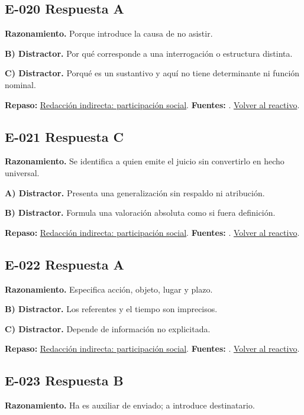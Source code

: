 \subsection*{E-020 \quad Respuesta A}\label{s:E-020}
\textbf{Razonamiento.} Porque introduce la causa de no asistir.

\textbf{B) Distractor. }Por qué corresponde a una interrogación o estructura distinta.

\textbf{C) Distractor. }Porqué es un sustantivo y aquí no tiene determinante ni función nominal.

\textbf{Repaso:} \hyperref[sec:e2]{Redacción indirecta: participación social}. \textbf{Fuentes:} \cite{rae,writing}. \hyperref[q:E-020]{Volver al reactivo}.\par\medskip

\subsection*{E-021 \quad Respuesta C}\label{s:E-021}
\textbf{Razonamiento.} Se identifica a quien emite el juicio sin convertirlo en hecho universal.

\textbf{A) Distractor. }Presenta una generalización sin respaldo ni atribución.

\textbf{B) Distractor. }Formula una valoración absoluta como si fuera definición.

\textbf{Repaso:} \hyperref[sec:e2]{Redacción indirecta: participación social}. \textbf{Fuentes:} \cite{rae,writing}. \hyperref[q:E-021]{Volver al reactivo}.\par\medskip

\subsection*{E-022 \quad Respuesta A}\label{s:E-022}
\textbf{Razonamiento.} Especifica acción, objeto, lugar y plazo.

\textbf{B) Distractor. }Los referentes y el tiempo son imprecisos.

\textbf{C) Distractor. }Depende de información no explicitada.

\textbf{Repaso:} \hyperref[sec:e2]{Redacción indirecta: participación social}. \textbf{Fuentes:} \cite{rae,writing}. \hyperref[q:E-022]{Volver al reactivo}.\par\medskip

\subsection*{E-023 \quad Respuesta B}\label{s:E-023}
\textbf{Razonamiento.} Ha es auxiliar de enviado; a introduce destinatario.

